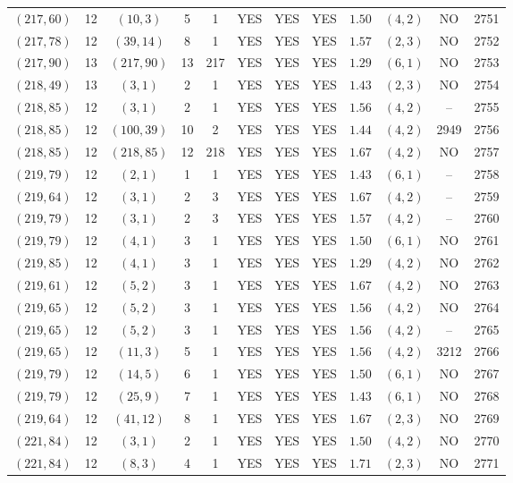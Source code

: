 \begin{longtable}{|c|c|c|c|c|c|c|c|c|c|c|c|}
$(217,60)$ & 12 & $(10,3)$ & 5 & 1 & YES & YES & YES & $1.50$ & $(4,2)$ & NO & 2751\\
$(217,78)$ & 12 & $(39,14)$ & 8 & 1 & YES & YES & YES & $1.57$ & $(2,3)$ & NO & 2752\\
$(217,90)$ & 13 & $(217,90)$ & 13 & 217 & YES & YES & YES & $1.29$ & $(6,1)$ & NO & 2753\\
$(218,49)$ & 13 & $(3,1)$ & 2 & 1 & YES & YES & YES & $1.43$ & $(2,3)$ & NO & 2754\\
$(218,85)$ & 12 & $(3,1)$ & 2 & 1 & YES & YES & YES & $1.56$ & $(4,2)$ & -- & 2755\\
$(218,85)$ & 12 & $(100,39)$ & 10 & 2 & YES & YES & YES & $1.44$ & $(4,2)$ & 2949 & 2756\\
$(218,85)$ & 12 & $(218,85)$ & 12 & 218 & YES & YES & YES & $1.67$ & $(4,2)$ & NO & 2757\\
$(219,79)$ & 12 & $(2,1)$ & 1 & 1 & YES & YES & YES & $1.43$ & $(6,1)$ & -- & 2758\\
$(219,64)$ & 12 & $(3,1)$ & 2 & 3 & YES & YES & YES & $1.67$ & $(4,2)$ & -- & 2759\\
$(219,79)$ & 12 & $(3,1)$ & 2 & 3 & YES & YES & YES & $1.57$ & $(4,2)$ & -- & 2760\\
$(219,79)$ & 12 & $(4,1)$ & 3 & 1 & YES & YES & YES & $1.50$ & $(6,1)$ & NO & 2761\\
$(219,85)$ & 12 & $(4,1)$ & 3 & 1 & YES & YES & YES & $1.29$ & $(4,2)$ & NO & 2762\\
$(219,61)$ & 12 & $(5,2)$ & 3 & 1 & YES & YES & YES & $1.67$ & $(4,2)$ & NO & 2763\\
$(219,65)$ & 12 & $(5,2)$ & 3 & 1 & YES & YES & YES & $1.56$ & $(4,2)$ & NO & 2764\\
$(219,65)$ & 12 & $(5,2)$ & 3 & 1 & YES & YES & YES & $1.56$ & $(4,2)$ & -- & 2765\\
$(219,65)$ & 12 & $(11,3)$ & 5 & 1 & YES & YES & YES & $1.56$ & $(4,2)$ & 3212 & 2766\\
$(219,79)$ & 12 & $(14,5)$ & 6 & 1 & YES & YES & YES & $1.50$ & $(6,1)$ & NO & 2767\\
$(219,79)$ & 12 & $(25,9)$ & 7 & 1 & YES & YES & YES & $1.43$ & $(6,1)$ & NO & 2768\\
$(219,64)$ & 12 & $(41,12)$ & 8 & 1 & YES & YES & YES & $1.67$ & $(2,3)$ & NO & 2769\\
$(221,84)$ & 12 & $(3,1)$ & 2 & 1 & YES & YES & YES & $1.50$ & $(4,2)$ & NO & 2770\\
$(221,84)$ & 12 & $(8,3)$ & 4 & 1 & YES & YES & YES & $1.71$ & $(2,3)$ & NO & 2771\\

\end{longtable}
